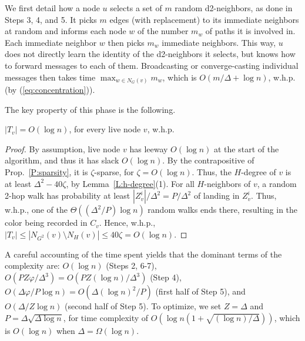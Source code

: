 We first detail how a node $u$ selects a set of $m$ random d2-neighbors, as done in Steps 3, 4, and 5. It picks $m$ edges (with replacement) to its immediate neighbors at random and informs each node $w$ of the number $m_w$ of paths it is involved in. Each immediate neighbor $w$ then picks $m_w$ immediate neighbors. This way, $u$ does not directly learn the identity of the d2-neighbors it selects, but knows how to forward messages to each of them. Broadcasting or converge-casting individual messages then takes time $\max_{w \in N_G(v)} m_w$, which is $O(m/\Delta + \log n)$, w.h.p. (by (\ref{eq:concentration})).

The key property of this phase is the following.

\begin{lemma}
$|T_v| = O(\log n)$, for every live node $v$, w.h.p.
\label{l:last}
\end{lemma}

\begin{proof}
By assumption, live node $v$ has leeway $O(\log n)$ at the start of the algorithm, and thus it has slack $O(\log n)$. 
By the contrapositive of Prop.~\ref{P:sparsity}, it is $\zeta$-sparse, for $\zeta=O(\log n)$. 
Thus, the $H$-degree of $v$ is at least $\Delta^2 - 40\zeta$, by Lemma~\ref{L:h-degree}(1). For all $H$-neighbors of $v$, a random 2-hop walk has probability at least $|Z_v^i|/\Delta^2 = P/\Delta^2$ of landing in $Z_v^i$. 
Thus, w.h.p., one of the $\Theta((\Delta^2/P)\log n)$ random walks ends there, resulting in the color being recorded in $C_v$. 
Hence, w.h.p., $|T_v| \le |N_{G^2}(v)\setminus N_H(v)| \le 40\zeta = O(\log n)$.
\end{proof}

A careful accounting of the time spent yields that the dominant terms of the complexity are: $O(\log n)$ (Steps 2, 6-7), $O(PZ\varphi/\Delta^3) = O(PZ (\log n)/\Delta^3)$ (Step 4), $O(\Delta\varphi/P \log n) = O(\Delta(\log n)^2/P)$ (first half of Step 5), and $O(\Delta/Z \log n)$ (second half of Step 5). To optimize, we set $Z = \Delta$ and $P = \Delta \sqrt{\Delta\log n}$, for time complexity of $O(\log n (1 + \sqrt{(\log n)/\Delta}))$, which is $O(\log n)$ when $\Delta = \Omega(\log n)$. 

